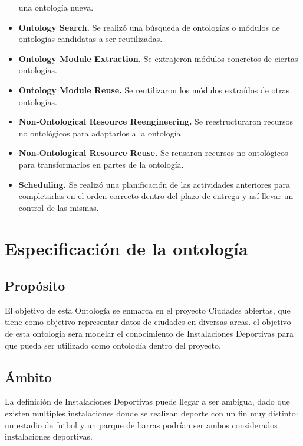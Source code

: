 \documentclass[a4paper,12pt]{article}
\begin{document}
\begin{itemize}
una ontología nueva.
		\item \textbf{Ontology Search.} Se realizó una búsqueda de ontologías o módulos de ontologías
candidatas a ser reutilizadas.
		\item \textbf{Ontology Module Extraction.} Se extrajeron módulos concretos de ciertas ontologías.
		\item \textbf{Ontology Module Reuse.} Se reutilizaron los módulos extraídos de otras ontologías.
		\item \textbf{Non-Ontological Resource Reengineering.} Se reestructuraron recursos no
ontológicos para adaptarlos a la ontología.
		\item \textbf{Non-Ontological Resource Reuse.} Se reusaron recursos no ontológicos para
transformarlos en partes de la ontología.
		\item \textbf{Scheduling.} Se realizó una planificación de las actividades anteriores para
completarlas en el orden correcto dentro del plazo de entrega y así llevar un control de las mismas.
	\end{itemize}
	
	\section{Especificación de la ontología}
	
	\subsection{Propósito}
	El objetivo de esta Ontología se enmarca en el proyecto Ciudades abiertas, que tiene como objetivo representar datos de ciudades en diversas areas. el objetivo de esta ontología sera modelar el conocimiento de Instalaciones Deportivas para que pueda ser utilizado como ontolodía dentro del proyecto.
	
	\subsection{Ámbito}
	La definición de Instalaciones Deportivas puede llegar a ser ambigua, dado que existen multiples instalaciones donde se realizan deporte con un fin muy distinto: un estadio de futbol y un parque de barras podrían ser ambos considerados instalaciones deportivas.
	
\end{document}

